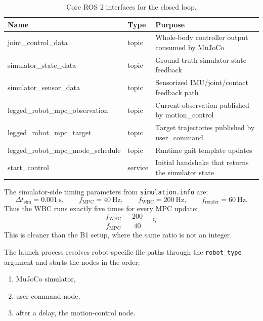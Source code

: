 \documentclass[11pt,a4paper]{article}
\newcommand{\code}[1]{\texttt{#1}}
\begin{document}
\begin{table}[ht]
\centering
\small
\begin{tabularx}{\textwidth}{>{\ttfamily}l >{\ttfamily}l >{\raggedright\arraybackslash}X}
\toprule
\textbf{Name} & \textbf{Type} & \textbf{Purpose} \\
\midrule
joint\_control\_data & topic & Whole-body controller output consumed by MuJoCo \\
simulator\_state\_data & topic & Ground-truth simulator state feedback \\
simulator\_sensor\_data & topic & Sensorized IMU/joint/contact feedback path \\
legged\_robot\_mpc\_observation & topic & Current observation published by motion\_control \\
legged\_robot\_mpc\_target & topic & Target trajectories published by user\_command \\
legged\_robot\_mpc\_mode\_schedule & topic & Runtime gait template updates \\
start\_control & service & Initial handshake that returns the simulator state \\
\bottomrule
\end{tabularx}
\caption{Core ROS 2 interfaces for the closed loop.}
\label{tab:rosio}
\end{table}

The simulator-side timing parameters from \code{simulation.info} are:
\begin{equation}
\Delta t_{\mathrm{sim}} = 0.001~\mathrm{s}, \qquad
f_{\mathrm{MPC}} = 40~\mathrm{Hz}, \qquad
f_{\mathrm{WBC}} = 200~\mathrm{Hz}, \qquad
f_{\mathrm{render}} = 60~\mathrm{Hz}.
\end{equation}
Thus the WBC runs exactly five times for every MPC update:
\begin{equation}
\frac{f_{\mathrm{WBC}}}{f_{\mathrm{MPC}}} = \frac{200}{40} = 5.
\end{equation}
This is cleaner than the B1 setup, where the same ratio is not an integer.

The launch process resolves robot-specific file paths through the \code{robot\_type} argument and starts the nodes in the order:
\begin{enumerate}[leftmargin=*]
  \item MuJoCo simulator,
  \item user command node,
  \item after a delay, the motion-control node.
\end{enumerate}
\end{document}
